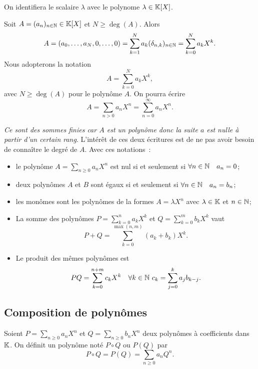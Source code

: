 On identifiera le scalaire $\lambda$ avec le polynome $\lambda \in \mathbb{K}[X]$.

Soit $A=(a_n)_{n \in \mathbb{N}} \in \mathbb{K}[X]$ et $N \geqslant \deg(A)$. Alors
\begin{equation}
  A = (a_0, \ldots, a_N, 0, \ldots, 0) = \sum_{k=1}^N a_k (\delta_{n,k})_{n \in \mathbb{N}}=\sum_{k=0}^N a_k X^k.
\end{equation}
Nous adopterons la notation
\begin{equation}
  A = \sum_{k=0}^N a_k X^k,
\end{equation}
avec $N \geqslant \deg(A)$ pour le polynôme $A$. On pourra écrire
\begin{equation}
  A = \sum_{n>0} a_n X^n = \sum_{n=0}^{\infty} a_n X^n.
\end{equation}

\emph{Ce sont des sommes finies car $A$ est un polynôme donc la suite $a$ est nulle à partir d'un certain rang}. L'intérêt de ces deux écritures est de ne pas avoir besoin de connaître le degré de $A$. Avec ces notations~:
\begin{itemize}
\item le polynôme $A=\sum_{n\geqslant 0} a_n X^n$ est nul si et seulement si $\forall n \in \mathbb{N} \quad a_n =0$;
\item deux polynômes $A$ et $B$ sont égaux si et seulement si $\forall n \in \mathbb{N} \quad a_n =b_n$;
\item les monômes sont les polynômes de la formes $A=\lambda X^n$ avec $\lambda \in \mathbb{K}$ et $n \in \mathbb{N}$;
\item La somme des polynômes $P=\sum_{k=0}^n a_k X^k$ et $Q=\sum_{k=0}^m b_k X^k$ vaut
  \begin{equation}
    P+Q = \sum_{k=0}^{\max(n,m)}(a_k+b_k) X^k.
  \end{equation}
\item Le produit des mêmes polynômes est
  \begin{equation}
    PQ = \sum_{k=0}^{n+m} c_k X^k \quad \forall k \in \mathbb{N} \ c_k=\sum_{j=0}^k a_j b_{k-j}.
  \end{equation}
\end{itemize}

\subsection{Composition de polynômes}

\begin{defdef}
  Soient $P=\sum_{n \geqslant 0} a_n X^n$ et $Q=\sum_{n \geqslant 0} b_n X^n$ deux polynômes à coefficients dans $\mathbb{K}$. On définit un polynôme noté $P \circ Q$ ou $P(Q)$ par
  \begin{equation}
    P \circ Q = P(Q) = \sum_{n \geqslant 0} a_n Q^n.
  \end{equation}
\end{defdef}

